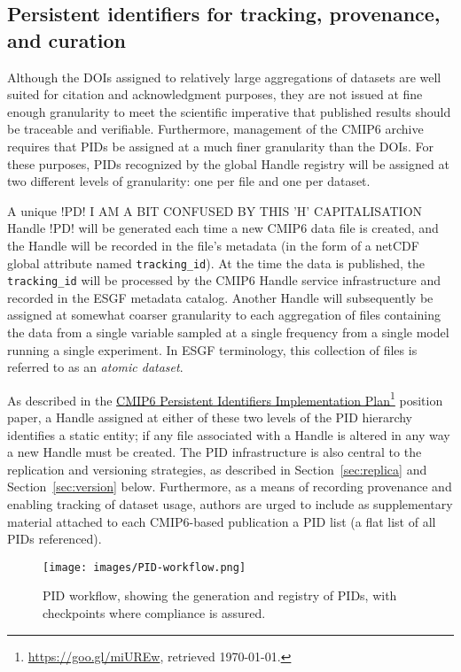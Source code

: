 \documentclass[gmd,manuscript]{copernicus}
\newcommand{\urlref}[2] {\href{#1}{#2}\footnote{\url{#1}, retrieved \today.}}
\begin{document}
\subsection{Persistent identifiers for tracking, provenance, and
  curation}
\label{sec:pid}

Although the DOIs assigned to relatively large aggregations of
datasets are well suited for citation and acknowledgment purposes,
they are not issued at fine enough granularity to meet the scientific
imperative that published results should be traceable and verifiable.
Furthermore, management of the CMIP6 archive requires that PIDs be
assigned at a much finer granularity than the DOIs. For these
purposes, PIDs recognized by the global Handle registry will be
assigned at two different levels of granularity: one per file and 
one per dataset.

A unique
!PD! I AM A BIT CONFUSED BY THIS 'H' CAPITALISATION Handle !PD!
will be generated each time a new CMIP6 data file is
created, and the Handle will be recorded in the file's metadata (in
the form of a netCDF global attribute named \texttt{tracking\_id}). At
the time the data is published, the \texttt{tracking\_id} will be
processed by the CMIP6 Handle service infrastructure and recorded in
the ESGF metadata catalog. Another Handle will subsequently be
assigned at somewhat coarser granularity to each aggregation of files
containing the data from a single variable sampled at a single
frequency
from a single model running a single experiment. In ESGF terminology,
this collection of files is referred to as an \emph{atomic dataset}.

As described in the \urlref{https://goo.gl/miUREw}{CMIP6 Persistent
Identifiers Implementation Plan} position paper, a Handle assigned
at either of these two levels of the PID hierarchy identifies a static
entity; if any file associated with a Handle is altered in any way a
new Handle must be created. The PID infrastructure is also central to
the replication and versioning strategies, as described in
Section~\ref{sec:replica} and Section~\ref{sec:version} below.
Furthermore, as a means of recording provenance and enabling tracking
of dataset usage, authors are urged to include as supplementary
material attached to each CMIP6-based publication a PID list (a flat
list of all PIDs referenced).

\begin{figure*}
  \begin{center}
    \texttt{[image: images/PID-workflow.png]}
  \end{center}
  \caption{PID workflow, showing the generation and registry of PIDs,
    with checkpoints where compliance is assured.}
  \label{fig:pidflow}
\end{figure*}
\end{document}

